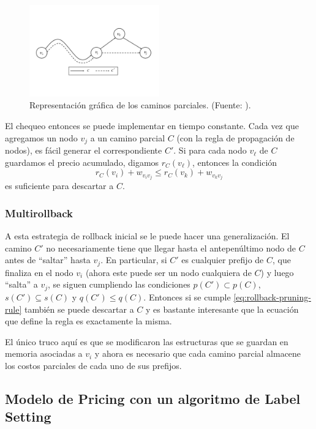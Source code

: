 \begin{figure}[H]
\centering
\includegraphics[width=0.5\textwidth]{img/rollback_pruning.jpg}
\caption{Representación gráfica de los caminos parciales. (Fuente: \cite{lozano-duque-medaglia}).}
\label{fig:rollback-pruning}
\centering
\end{figure}

El chequeo entonces se puede implementar en tiempo constante. Cada vez que agregamos un nodo $v_j$ a un camino parcial $C$ (con la regla de propagación de nodos), es fácil generar el correspondiente $C'$. Si para cada nodo $v_{\ell}$ de $C$ guardamos el precio acumulado, digamos $r_C(v_{\ell})$, entonces la condición
\begin{equation}
\label{eq:rollback-pruning-rule}
    r_C(v_i) + w_{v_i v_j} \leq r_C(v_k) + w_{v_k v_j}
\end{equation}
es suficiente para descartar a $C$. 

\subsubsection{Multirollback}

A esta estrategia de rollback inicial se le puede hacer una generalización. El camino $C'$ no necesariamente tiene que llegar hasta el antepenúltimo nodo de $C$ antes de ``saltar'' hasta $v_j$. En particular, si $C'$ es cualquier prefijo de $C$, que finaliza en el nodo $v_i$ (ahora este puede ser un nodo cualquiera de $C$) y luego ``salta'' a $v_j$, se siguen cumpliendo las condiciones $p(C') \subset p(C)$, $s(C') \subseteq s(C)$ y $q(C') \leq q(C)$. Entonces si se cumple \ref{eq:rollback-pruning-rule} también se puede descartar a $C$ y es bastante interesante que la ecuación que define la regla es exactamente la misma. 

El único truco aquí es que se modificaron las estructuras que se guardan en memoria asociadas a $v_i$ y ahora es necesario que cada camino parcial almacene los costos parciales de cada uno de sus prefijos.


\subsection{Modelo de Pricing con un algoritmo de Label Setting}
\label{section:pricing-labeling}

